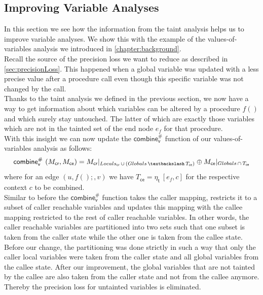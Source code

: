     \subsection{Improving Variable Analyses}\label{sec:formalImprove}
    In this section we see how the information from the taint analysis helps us to improve variable analyses. We show this with the example of the values-of-variables analysis we introduced in \autoref{chapter:background}.\\
    Recall the source of the precision loss we want to reduce as described in \autoref{sec:precisionLoss}. This happened when a global variable was updated with a less precise value after a procedure call even though this specific variable was not changed by the call.\\
    Thanks to the taint analysis we defined in the previous section, we now have a way to get information about which variables can be altered by a procedure $f()$ and which surely stay untouched. The latter of which are exactly those variables which are not in the tainted set of the end node $e_f$ for that procedure.\\
    With this insight we can now update the $\textsf{combine}^{\#}_\textsf{v}$ function of our values-of-variables analysis as follows:
    \[
      \textsf{combine}^{\#}_\textsf{v}\ (M_\textsf{cr}, M_\textsf{ce}) = M_\textsf{cr}|_{Locals_\textsf{cr}\, \cup\, (Globals\, \textbackslash\, T_\textsf{ce})} \oplus M_\textsf{ce}|_{Globals\, \cap\, T_\textsf{ce}}
    \]
    where for an edge $(u, f();, v)$ we have $T_\textsf{ce} = \eta_\textsf{t}\ [e_f, c]$ for the respective context $c$ to be combined.\\
    Similar to before the $\textsf{combine}^{\#}_\textsf{v}$ function takes the caller mapping, restricts it to a subset of caller reachable variables and updates this mapping with the callee mapping restricted to the rest of caller reachable variables. In other words, the caller reachable variables are partitioned into two sets such that one subset is taken from the caller state while the other one is taken from the callee state. Before our change, the partitioning was done strictly in such a way that only the caller local variables were taken from the caller state and all global variables from the callee state. After our improvement, the global variables that are not tainted by the callee are also taken from the caller state and not from the callee anymore. Thereby the precision loss for untainted variables is eliminated.
    \\
